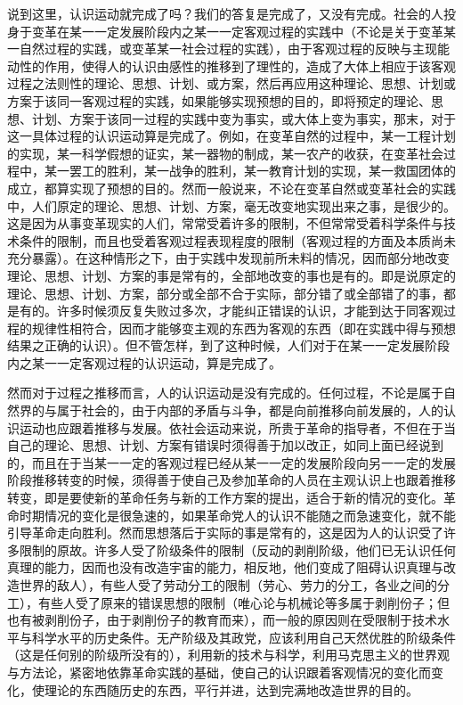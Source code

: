 说到这里，认识运动就完成了吗？我们的答复是完成了，又没有完成。社会的人投身于变革在某一一定发展阶段内之某一一定客观过程的实践中（不论是关于变革某一自然过程的实践，或变革某一社会过程的实践），由于客观过程的反映与主现能动性的作用，使得人的认识由感性的推移到了理性的，造成了大体上相应于该客观过程之法则性的理论、思想、计划、或方案，然后再应用这种理论、思想、计划或方案于该同一客观过程的实践，如果能够实现预想的目的，即将预定的理论、思想、计划、方案于该同一过程的实践中变为事实，或大体上变为事实，那末，对于这一具体过程的认识运动算是完成了。例如，在变革自然的过程中，某一工程计划的实现，某一科学假想的证实，某一器物的制成，某一农产的收获，在变革社会过程中，某一罢工的胜利，某一战争的胜利，某一教育计划的实现，某一救国团体的成立，都算实现了预想的目的。然而一般说来，不论在变革自然或变革社会的实践中，人们原定的理论、思想、计划、方案，毫无改变地实现出来之事，是很少的。这是因为从事变革现实的人们，常常受着许多的限制，不但常常受着科学条件与技术条件的限制，而且也受着客观过程表现程度的限制（客观过程的方面及本质尚未充分暴露）。在这种情形之下，由于实践中发现前所未料的情况，因而部分地改变理论、思想、计划、方案的事是常有的，全部地改变的事也是有的。即是说原定的理论、思想、计划、方案，部分或全部不合于实际，部分错了或全部错了的事，都是有的。许多时候须反复失败过多次，才能纠正错误的认识，才能到达于同客观过程的规律性相符合，因而才能够变主观的东西为客观的东西（即在实践中得与预想结果之正确的认识）。但不管怎样，到了这种时候，人们对于在某一一定发展阶段内之某一一定客观过程的认识运动，算是完成了。

然而对于过程之推移而言，人的认识运动是没有完成的。任何过程，不论是属于自然界的与属于社会的，由于内部的矛盾与斗争，都是向前推移向前发展的，人的认识运动也应跟着推移与发展。依社会运动来说，所贵于革命的指导者，不但在于当自己的理论、思想、计划、方案有错误时须得善于加以改正，如同上面已经说到的，而且在于当某一一定的客观过程已经从某一一定的发展阶段向另一一定的发展阶段推移转变的时候，须得善于使自己及参加革命的人员在主观认识上也跟着推移转变，即是要使新的革命任务与新的工作方案的提出，适合于新的情况的变化。革命时期情况的变化是很急速的，如果革命党人的认识不能随之而急速变化，就不能引导革命走向胜利。然而思想落后于实际的事是常有的，这是因为人的认识受了许多限制的原故。许多人受了阶级条件的限制（反动的剥削阶级，他们已无认识任何真理的能力，因而也没有改造宇宙的能力，相反地，他们变成了阻碍认识真理与改造世界的敌人），有些人受了劳动分工的限制（劳心、劳力的分工，各业之间的分工），有些人受了原来的错误思想的限制（唯心论与机械论等多属于剥削份子；但也有被剥削份子，由于剥削份子的教育而来），而一般的原因则在受限制于技术水平与科学水平的历史条件。无产阶级及其政党，应该利用自己天然优胜的阶级条件（这是任何别的阶级所没有的），利用新的技术与科学，利用马克思主义的世界观与方法论，紧密地依靠革命实践的基础，使自己的认识跟着客观情况的变化而变化，使理论的东西随历史的东西，平行并进，达到完满地改造世界的目的。

